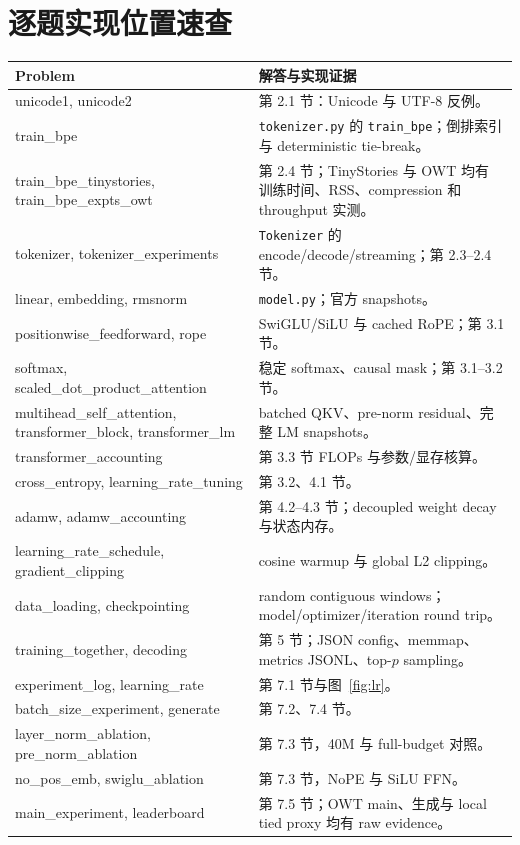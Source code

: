 \documentclass[UTF8,a4paper,11pt]{ctexart}
\begin{document}


\section{逐题实现位置速查}
\begin{longtable}{
  >{\raggedright\arraybackslash}p{.34\linewidth}
  >{\raggedright\arraybackslash}p{.58\linewidth}
}
\toprule
Problem & 解答与实现证据\\
\midrule
\endhead
unicode1, unicode2 & 第 2.1 节：Unicode 与 UTF-8 反例。\\
train\_bpe & \texttt{tokenizer.py} 的 \texttt{train\_bpe}；倒排索引与 deterministic tie-break。\\
train\_bpe\_tinystories, train\_bpe\_expts\_owt & 第 2.4 节；TinyStories 与 OWT 均有
训练时间、RSS、compression 和 throughput 实测。\\
tokenizer, tokenizer\_experiments & \texttt{Tokenizer} 的 encode/decode/streaming；第 2.3--2.4 节。\\
linear, embedding, rmsnorm & \texttt{model.py}；官方 snapshots。\\
positionwise\_feedforward, rope & SwiGLU/SiLU 与 cached RoPE；第 3.1 节。\\
softmax, scaled\_dot\_product\_attention & 稳定 softmax、causal mask；第 3.1--3.2 节。\\
multihead\_self\_attention, transformer\_block, transformer\_lm & batched QKV、pre-norm residual、完整 LM snapshots。\\
transformer\_accounting & 第 3.3 节 FLOPs 与参数/显存核算。\\
cross\_entropy, learning\_rate\_tuning & 第 3.2、4.1 节。\\
adamw, adamw\_accounting & 第 4.2--4.3 节；decoupled weight decay 与状态内存。\\
learning\_rate\_schedule, gradient\_clipping & cosine warmup 与 global L2 clipping。\\
data\_loading, checkpointing & random contiguous windows；model/optimizer/iteration round trip。\\
training\_together, decoding & 第 5 节；JSON config、memmap、metrics JSONL、top-$p$ sampling。\\
experiment\_log, learning\_rate & 第 7.1 节与图~\ref{fig:lr}。\\
batch\_size\_experiment, generate & 第 7.2、7.4 节。\\
layer\_norm\_ablation, pre\_norm\_ablation & 第 7.3 节，40M 与 full-budget 对照。\\
no\_pos\_emb, swiglu\_ablation & 第 7.3 节，NoPE 与 SiLU FFN。\\
main\_experiment, leaderboard & 第 7.5 节；OWT main、生成与 local tied proxy 均有 raw evidence。\\
\bottomrule
\end{longtable}
\end{document}
